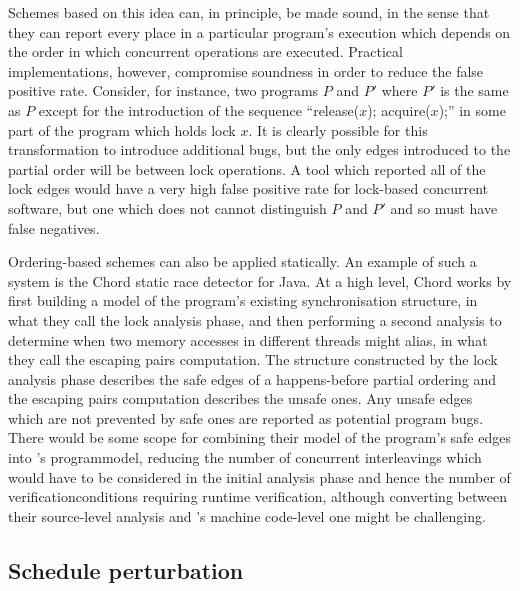 Schemes based on this idea can, in principle, be made sound, in the
sense that they can report every place in a particular program's
execution which depends on the order in which concurrent operations
are executed.  Practical implementations, however, compromise
soundness in order to reduce the false positive rate.  Consider, for
instance, two programs $P$ and $P'$ where $P'$ is the same as $P$
except for the introduction of the sequence ``release($x$);
acquire($x$);'' in some part of the program which holds lock $x$.  It
is clearly possible for this transformation to introduce additional
bugs, but the only edges introduced to the partial order will be
between lock operations.  A tool which reported all of the lock edges
would have a very high false positive rate for lock-based concurrent
software, but one which does not cannot distinguish $P$ and $P'$ and
so must have false negatives.


Ordering-based schemes can also be applied statically.  An example of
such a system is the Chord static race detector for
Java\cite{Naik2006}.  At a high level, Chord works by first building a
model of the program's existing synchronisation structure, in what
they call the lock analysis phase, and then performing a second
analysis to determine when two memory accesses in different threads
might alias, in what they call the escaping pairs computation.  The
structure constructed by the lock analysis phase describes the safe edges
of a happens-before partial ordering and the escaping pairs
computation describes the unsafe ones.  Any unsafe edges which are not
prevented by safe ones are reported as potential program bugs.  There
would be some scope for combining their model of the program's safe
edges into {\technique}'s \gls{programmodel}, reducing the number of
concurrent interleavings which would have to be considered in the
initial analysis phase and hence the number of
\glspl{verificationcondition} requiring runtime verification, although
converting between their source-level analysis and {\technique}'s
machine code-level one might be challenging.

\subsection{Schedule perturbation}

